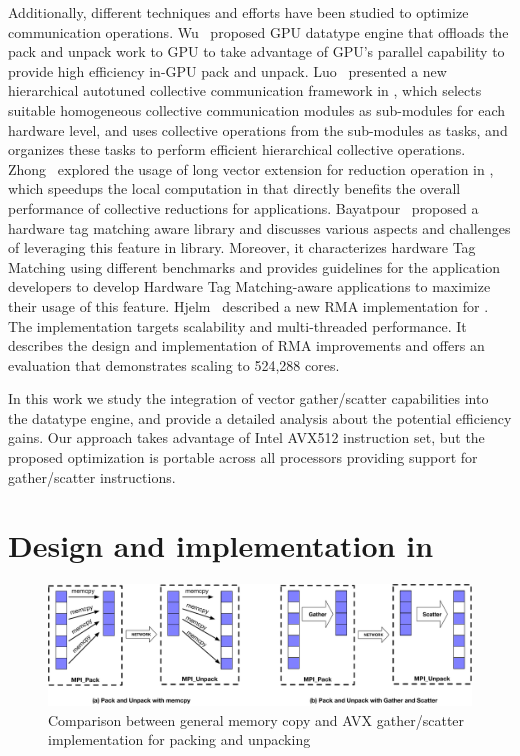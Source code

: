 \documentclass[conference]{IEEEtran}
\begin{document}
Additionally, different techniques and
efforts have been studied to optimize \mpi communication operations.
%
Wu~\cite{wu2016} proposed GPU datatype engine that offloads the pack and unpack
work to GPU to take advantage of GPU's parallel capability to provide
high efficiency in-GPU pack and unpack.
%
Luo~\cite{luo-han} presented a new hierarchical autotuned collective communication
framework in \ompi, which selects suitable homogeneous collective communication
modules as sub-modules for each hardware level, and uses collective operations from
the sub-modules as tasks, and organizes these tasks to perform efficient hierarchical collective operations.
%
Zhong~\cite{avxop} explored the usage of long vector extension for reduction operation in \mpi, which
speedups the local computation in \mpi that directly benefits the overall performance of
collective reductions for applications.
%
Bayatpour~\cite{Bayatpour} proposed a hardware tag matching aware \mpi library and discusses various aspects and challenges of leveraging this feature in \mpi library. Moreover, it characterizes
hardware Tag Matching using different benchmarks and provides guidelines for the
application developers to develop Hardware Tag Matching-aware applications to maximize their usage of this feature.
%
Hjelm~\cite{Hjelm} described a new RMA implementation for \ompi. The implementation targets scalability
and multi-threaded performance. It describes the design and implementation of RMA improvements
and offers an evaluation that demonstrates scaling to 524,288 cores.

In this work we study the integration of vector gather/scatter capabilities
into the \mpi datatype engine, and provide a detailed analysis about the
potential efficiency gains.
%
Our approach takes advantage of Intel AVX512 instruction set, but the proposed
optimization is portable across all processors providing support for
gather/scatter instructions.


\section{Design and implementation in \ompi}\label{sec:design}

\begin{figure}[ht]
  \centering
  \includegraphics[width=0.9\linewidth]{send_recv_gs1.pdf}
  \caption{Comparison between general memory copy and AVX gather/scatter implementation for packing and unpacking}
  \label{fig:send_recv_gs1}
\end{figure}
\end{document}
